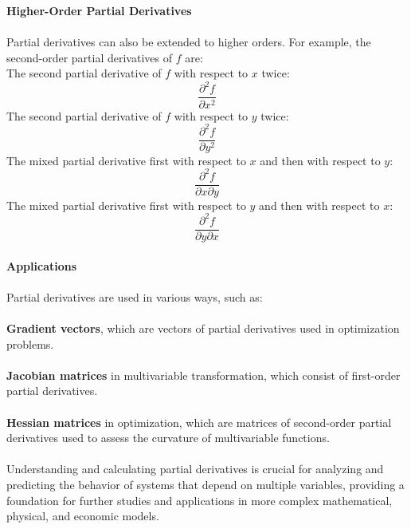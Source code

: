 \documentclass[12pt]{article}
\begin{document}
    \textbf{Higher-Order Partial Derivatives}\\
    \\
    Partial derivatives can also be extended to higher orders. For example, the second-order
    partial derivatives of \( f \) are:\\
    The second partial derivative of \( f \) with respect to \( x \) twice:
    \begin{equation}
        \frac{\partial^2 f}{\partial x^2}
    \end{equation}
    The second partial derivative of \( f \) with respect to \( y \) twice:
    \begin{equation}
        \frac{\partial^2 f}{\partial y^2}
    \end{equation}
    The mixed partial derivative first with respect to \( x \) and then with respect to \( y \):
    \begin{equation}
        \frac{\partial^2 f}{\partial x \partial y}
    \end{equation}
    The mixed partial derivative first with respect to \( y \) and then with respect to \( x \):
    \begin{equation}
        \frac{\partial^2 f}{\partial y \partial x}
    \end{equation}
    \\
    \textbf{Applications}\\
    \\
    Partial derivatives are used in various ways, such as:\\
    \\
    \textbf{Gradient vectors}, which are vectors of partial derivatives used in optimization
    problems.\\
    \\
    \textbf{Jacobian matrices} in multivariable transformation, which consist of
    first-order partial derivatives.\\
    \\
    \textbf{Hessian matrices} in optimization, which are matrices of second-order
    partial derivatives used to assess the curvature of multivariable functions.\\
    \\
    Understanding and calculating partial derivatives is crucial for analyzing and predicting
    the behavior of systems that depend on multiple variables, providing a foundation for
    further studies and applications in more complex mathematical, physical, and economic
    models.
\end{document}
